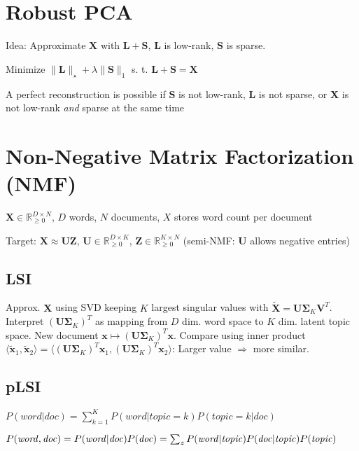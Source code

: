 \documentclass[a4paper, 11pt, landscape]{article}
\begin{document}
\begin{multicols*}{3}
\section{Robust PCA}
\begin{compactitem}
	\item Idea: Approximate $\mathbf{X}$ with $\mathbf{L} + \mathbf{S}$, $\mathbf{L}$ is low-rank, $\mathbf{S}$ is sparse.
	\item Minimize $\|\mathbf{L}\|_\star + \lambda \|\mathbf{S}\|_1$ s. t. $\mathbf{L} + \mathbf{S} = \mathbf{X}$
	\item A perfect reconstruction is possible if $\mathbf{S}$ is not low-rank, $\mathbf{L}$ is not sparse, or $\mathbf{X}$ is not low-rank \textit{and} sparse at the same time
\end{compactitem}

\section{Non-Negative Matrix Factorization (NMF)}
\begin{inparaitem}
	\item $\mathbf{X} \in \mathbb{R}^{D \times N}_{\geq 0}$, $D$ words, $N$ documents, $X$ stores word count per document
	\item Target: $\mathbf{X} \approx \mathbf{UZ}$, $\mathbf{U} \in \mathbb{R}^{D \times K}_{\geq 0}$, $\mathbf{Z} \in \mathbb{R}^{K \times N}_{\geq 0}$ (semi-NMF: $\mathbf{U}$ allows negative entries)
\end{inparaitem}

\subsection{LSI}
Approx. $\mathbf{X}$ using SVD keeping $K$ largest singular values with $\tilde{\mathbf{X}} = \mathbf{U} \boldsymbol{\Sigma}_K \mathbf{V}^T$. Interpret $(\mathbf{U} \boldsymbol{\Sigma}_K)^T$ as mapping from $D$ dim. word space to $K$ dim. latent topic space. New document $\mathbf{x} \mapsto (\mathbf{U} \boldsymbol{\Sigma}_K)^T \mathbf{x}$. Compare using inner product $\langle \tilde{\mathbf{x}}_1, \tilde{\mathbf{x}}_2 \rangle = \langle (\mathbf{U} \boldsymbol{\Sigma}_K)^T \mathbf{x}_1, (\mathbf{U} \boldsymbol{\Sigma}_K)^T \mathbf{x}_2 \rangle$: Larger value $\Rightarrow$ more similar.

\subsection{pLSI}
\begin{compactitem}
	\item $P(\mathit{word} | \mathit{doc}) = \sum_{k=1}^K P(\mathit{word} | \mathit{topic} = k) P(\mathit{topic} = k | \mathit{doc})$
	\item $P(\mathit{word}, \mathit{doc}) = P(\mathit{word} | \mathit{doc}) P(\mathit{doc}) \break= \sum_z P(\mathit{word} | \mathit{topic}) P(\mathit{doc} | \mathit{topic}) P(\mathit{topic})$
\end{compactitem}


\end{multicols*}
\end{document}
